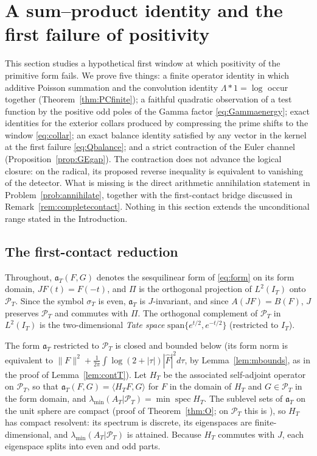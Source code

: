 \documentclass[11pt]{amsart}
\theoremstyle{definition}
\theoremstyle{remark}
\newcommand{\PT}{\mathcal P_T}
\newcommand{\IT}{I_T}
\newcommand{\lamA}{\lambda_{\min}(A_T|\PT)}
\newcommand{\sT}{\sigma_T}
\newcommand{\Fh}{\widehat F}
\begin{document}
\section{A sum--product identity and the first failure of positivity}\label{sec:firstcontact}

This section studies a hypothetical first window at which positivity of the primitive form fails.
We prove five things: a finite operator identity in which additive Poisson summation and the
convolution identity $\Lambda*1=\log$ occur together (Theorem~\ref{thm:PCfinite}); a faithful
quadratic observation of a test function by the positive odd poles of the Gamma factor
\eqref{eq:Gammaenergy}; exact identities for the exterior collars produced by compressing the
prime shifts to the window \eqref{eq:collar}; an exact balance identity satisfied by any vector in
the kernel at the first failure \eqref{eq:Qbalance}; and a strict contraction of the Euler channel
(Proposition~\ref{prop:GEgap}).  The contraction does not advance the logical closure: on the
radical, its proposed reverse inequality is equivalent to vanishing of the detector.  What is
missing is the direct arithmetic annihilation statement in Problem~\ref{prob:annihilate}, together
with the first-contact bridge discussed in Remark~\ref{rem:completecontact}.  Nothing in this
section extends the unconditional range stated in the Introduction.

\subsection{The first-contact reduction}

Throughout, $\mathfrak a_T(F,G)$ denotes the sesquilinear form of \eqref{eq:form} on its form
domain, $J F(t)=F(-t)$, and $\Pi$ is the orthogonal projection of $L^2(\IT)$ onto $\PT$. Since the
symbol $\sT$ is even, $\mathfrak a_T$ is $J$-invariant, and since $A(JF)=B(F)$, $J$ preserves $\PT$
and commutes with $\Pi$. The orthogonal complement of $\PT$ in $L^2(\IT)$ is the two-dimensional
\emph{Tate space} $\mathrm{span}\{e^{t/2},e^{-t/2}\}$ (restricted to $\IT$).

The form $\mathfrak a_T$ restricted to $\PT$ is closed and bounded below (its form norm is
equivalent to $\|F\|^2+\frac1{2\pi}\int\log(2+|\tau|)|\Fh|^2d\tau$, by Lemma~\ref{lem:mbounds}, as in
the proof of Lemma~\ref{lem:contT}). Let $H_T$ be the associated self-adjoint operator on $\PT$, so
that $\mathfrak a_T(F,G)=\langle H_TF,G\rangle$ for $F$ in the domain of $H_T$ and $G\in\PT$ in the
form domain, and $\lamA=\min\operatorname{spec}H_T$. The sublevel sets of $\mathfrak a_T$ on the
unit sphere are compact (proof of Theorem~\ref{thm:O}; on $\PT$ this is
\cite[Thm.~3]{Bombieri2000}), so $H_T$ has compact resolvent: its spectrum is discrete, its
eigenspaces are finite-dimensional, and $\lamA$ is attained. Because $H_T$ commutes with $J$, each
eigenspace splits into even and odd parts.
\end{document}
